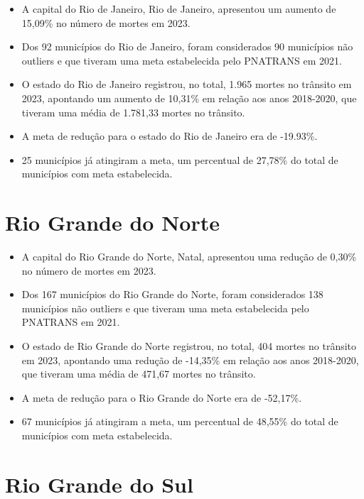 \documentclass[
  letterpaper,
  DIV=11,
  numbers=noendperiod]{scrreprt}
\begin{document}
\begin{itemize}
\item
  A capital do Rio de Janeiro, Rio de Janeiro, apresentou um aumento de
  15,09\% no número de mortes em 2023.
\item
  Dos 92 municípios do Rio de Janeiro, foram considerados 90 municípios
  não outliers e que tiveram uma meta estabelecida pelo PNATRANS em
  2021.
\item
  O estado do Rio de Janeiro registrou, no total, 1.965 mortes no
  trânsito em 2023, apontando um aumento de 10,31\% em relação aos anos
  2018-2020, que tiveram uma média de 1.781,33 mortes no trânsito.
\item
  A meta de redução para o estado do Rio de Janeiro era de -19.93\%.
\item
  25 municípios já atingiram a meta, um percentual de 27,78\% do total
  de municípios com meta estabelecida.
\end{itemize}

\section{Rio Grande do Norte}\label{rio-grande-do-norte}

\begin{itemize}
\item
  A capital do Rio Grande do Norte, Natal, apresentou uma redução de
  0,30\% no número de mortes em 2023.
\item
  Dos 167 municípios do Rio Grande do Norte, foram considerados 138
  municípios não outliers e que tiveram uma meta estabelecida pelo
  PNATRANS em 2021.
\item
  O estado de Rio Grande do Norte registrou, no total, 404 mortes no
  trânsito em 2023, apontando uma redução de -14,35\% em relação aos
  anos 2018-2020, que tiveram uma média de 471,67 mortes no trânsito.
\item
  A meta de redução para o Rio Grande do Norte era de -52,17\%.
\item
  67 municípios já atingiram a meta, um percentual de 48,55\% do total
  de municípios com meta estabelecida.
\end{itemize}

\section{Rio Grande do Sul}\label{rio-grande-do-sul}
\end{document}

